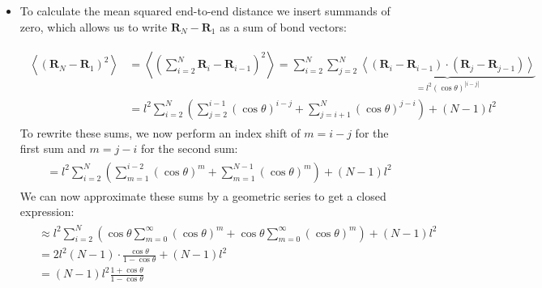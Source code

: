 \documentclass[a4paper,10pt,bibtotoc]{scrartcl}
\begin{document}
\begin{itemize}
\item To calculate the mean squared end-to-end distance we insert summands of zero, which allows us to write $\mathbf{R}_N-\mathbf{R}_1$ as a sum of bond vectors:

\begin{align}
\begin{split}
\left\langle\left(\mathbf{R}_N-\mathbf{R}_1\right)^2\right\rangle &= \left\langle\left(\sum_{i=2}^{N}\mathbf{R}_i-\mathbf{R}_{i-1}\right)^2\right\rangle = \sum_{i=2}^{N}\sum_{j=2}^{N}\underbrace{\left\langle\left(\mathbf{R}_i-\mathbf{R}_{i-1}\right)\cdot\left(\mathbf{R}_j-\mathbf{R}_{j-1}\right)\right\rangle}_{=l^2\left(\cos\theta\right)^{\left|i-j\right|}}\\
&= l^2\sum_{i=2}^{N}\left(\sum_{j=2}^{i-1}\left(\cos\theta\right)^{i-j}+\sum_{j=i+1}^{N}\left(\cos\theta\right)^{j-i}\right) + \left(N-1\right)l^2
\end{split}
\end{align}
To rewrite these sums, we now perform an index shift of $m=i-j$ for the first sum and $m=j-i$ for the second sum:
\begin{align*}
\begin{split}
&= l^2\sum_{i=2}^{N}\left(\sum_{m=1}^{i-2}\left(\cos\theta\right)^m+\sum_{m=1}^{N-1}\left(\cos\theta\right)^m\right) + \left(N-1\right)l^2
\end{split}
\end{align*}
We can now approximate these sums by a geometric series to get a closed expression:
\begin{align*}
\begin{split}
&\approx  l^2\sum_{i=2}^{N}\left(\cos\theta\sum_{m=0}^{\infty}\left(\cos\theta\right)^m+\cos\theta\sum_{m=0}^{\infty}\left(\cos\theta\right)^m\right) + \left(N-1\right)l^2\\ 
&= 2l^2\left(N-1\right)\cdot\frac{\cos\theta}{1-\cos\theta} + \left(N-1\right)l^2\\
&= \left(N-1\right) l^2\frac{1+\cos\theta}{1-\cos\theta}
\end{split}
\end{align*}


\end{itemize}
\end{document}
